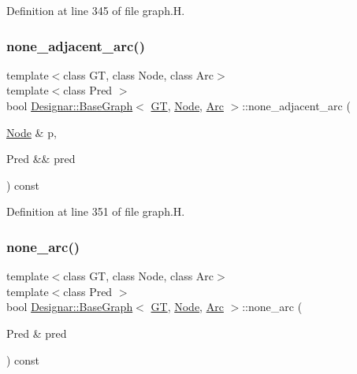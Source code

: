 Definition at line 345 of file graph.\+H.

\mbox{\label{class_designar_1_1_base_graph_adbacdf829cb2f21aff498bac9c9a8b8b}} 
\subsubsection{\texorpdfstring{none\+\_\+adjacent\+\_\+arc()}{none\_adjacent\_arc()}\hspace{0.1cm}{\footnotesize\ttfamily [2/2]}}
{\footnotesize\ttfamily template$<$class GT, class Node, class Arc$>$ \\
template$<$class Pred $>$ \\
bool \hyperlink{class_designar_1_1_base_graph}{Designar\+::\+Base\+Graph}$<$ \hyperlink{demo-buildgraph_8_c_a3001c40d2c31ca87ed96cd7d1334a55e}{GT}, \hyperlink{namespace_designar_a5af326c65aa2bd26b26c410f2030d09e}{Node}, \hyperlink{namespace_designar_a3f55fb5513d62ff47cbc8f72b8e95d6f}{Arc} $>$\+::none\+\_\+adjacent\+\_\+arc (\begin{DoxyParamCaption}\item[{\hyperlink{namespace_designar_a5af326c65aa2bd26b26c410f2030d09e}{Node} \&}]{p,  }\item[{Pred \&\&}]{pred }\end{DoxyParamCaption}) const\hspace{0.3cm}{\ttfamily [inline]}}



Definition at line 351 of file graph.\+H.

\mbox{\label{class_designar_1_1_base_graph_a023f28dd8824ba7a0c26342effd0fddf}} 
\subsubsection{\texorpdfstring{none\+\_\+arc()}{none\_arc()}\hspace{0.1cm}{\footnotesize\ttfamily [1/2]}}
{\footnotesize\ttfamily template$<$class GT, class Node, class Arc$>$ \\
template$<$class Pred $>$ \\
bool \hyperlink{class_designar_1_1_base_graph}{Designar\+::\+Base\+Graph}$<$ \hyperlink{demo-buildgraph_8_c_a3001c40d2c31ca87ed96cd7d1334a55e}{GT}, \hyperlink{namespace_designar_a5af326c65aa2bd26b26c410f2030d09e}{Node}, \hyperlink{namespace_designar_a3f55fb5513d62ff47cbc8f72b8e95d6f}{Arc} $>$\+::none\+\_\+arc (\begin{DoxyParamCaption}\item[{Pred \&}]{pred }\end{DoxyParamCaption}) const\hspace{0.3cm}{\ttfamily [inline]}}



